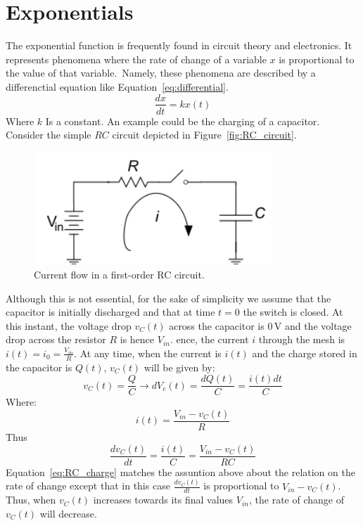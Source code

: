 \section{Exponentials}
The exponential function is frequently found in circuit theory and electronics. It represents phenomena where the rate of change of a variable $x$ is proportional to the value of that variable. Namely, these phenomena are described by a differenctial equation like Equation~\ref{eq:differential}.
\begin{equation}
\label{eq:differential}
\frac{dx}{dt} = kx(t)
\end{equation}
Where $k$ Is a constant. An example could be the charging of a capacitor. Consider the simple $RC$ circuit depicted in Figure~\ref{fig:RC_circuit}.
\begin{figure}[h!]
  \centering
  \includegraphics[width=0.8\textwidth]{"images/RC_circuit"}
  \caption{Current flow in a first-order RC circuit.} 
  \label{Fig:RC_circuit}
\end{figure}
Although this is not essential, for the sake of simplicity we assume that the capacitor is initially discharged and that at time $t=0$ the switch is closed.
At this instant, the voltage drop $v_C(t)$ across the capacitor is $0\,\textrm{V}$ and the voltage drop across the resistor $R$ is hence $V_{in}$. ence, the current $i$ through the mesh is $i(t)=i_0=\frac{V_{in}}{R}$. At any time, when the current is $i(t)$ and the charge stored in the capacitor is $Q(t)$, $v_C(t)$ will be given by:
\[v_C(t) = \frac{Q}{C} \longrightarrow dV_c(t) = \frac{dQ(t)}{C}=\frac{i(t)dt}{C}\]
Where:
\[i(t) = \frac{V_{in}-v_C(t)}{R}\]
Thus
\begin{equation}
\label{eq:RC_charge}
\frac{dv_C(t)}{dt}=\frac{i(t)}{C}=\frac{V_{in}-v_C(t)}{RC}
\end{equation}
Equation~\ref{eq:RC_charge} matches the assuntion above about the relation on the rate of change except that in this case $\frac{dv_C(t)}{dt}$ is proportional to $V_{in} - v_C(t)$. Thus, when $v_C(t)$ increases towards its final values $V_{in}$, the rate of change of $v_C(t)$ will decrease.

